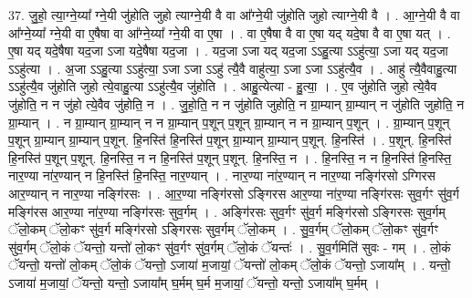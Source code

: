 \documentclass[17pt]{extarticle}
\begin{document}
37. जु॒हो॒ त्या॒ग्ने॒य्या᳚ ग्ने॒यी जु॑होति जुहो त्याग्ने॒यी वै वा आ᳚ग्ने॒यी जु॑होति जुहो त्याग्ने॒यी वै । . आ॒ग्ने॒यी वै वा आ᳚ग्ने॒य्या᳚ ग्ने॒यी वा ए॒षैषा वा आ᳚ग्ने॒य्या᳚ ग्ने॒यी वा ए॒षा । . वा ए॒षैषा वै वा ए॒षा यद् यदे॒षा वै वा ए॒षा यत् । . ए॒षा यद् यदे॒षैषा यद॒जा ऽजा यदे॒षैषा यद॒जा । . यद॒जा ऽजा यद् यद॒जा ऽऽहु॒त्या ऽऽहु॑त्या॒ ऽजा यद् यद॒जा ऽऽहु॑त्या । . अ॒जा ऽऽहु॒त्या ऽऽहु॑त्या॒ ऽजा ऽजा ऽऽहु॑ त्यै॒वै वाहु॑त्या॒ ऽजा ऽजा ऽऽहु॑त्यै॒व । . आहु॑ त्यै॒वैवाहु॒त्या ऽऽहु॑त्यै॒व जु॑होति जुहो त्ये॒वाहु॒त्या ऽऽहु॑त्यै॒व जु॑होति । . आहु॒त्येत्या - हु॒त्या॒ । . ए॒व जु॑होति जुहो त्ये॒वैव जु॑होति॒ न न जु॑हो त्ये॒वैव जु॑होति॒ न । . जु॒हो॒ति॒ न न जु॑होति जुहोति॒ न ग्रा॒म्यान् ग्रा॒म्यान् न जु॑होति जुहोति॒ न ग्रा॒म्यान् । . न ग्रा॒म्यान् ग्रा॒म्यान् न न ग्रा॒म्यान् प॒शून् प॒शून् ग्रा॒म्यान् न न ग्रा॒म्यान् प॒शून् । . ग्रा॒म्यान् प॒शून् प॒शून् ग्रा॒म्यान् ग्रा॒म्यान् प॒शून्. हि॒नस्ति॑ हि॒नस्ति॑ प॒शून् ग्रा॒म्यान् ग्रा॒म्यान् प॒शून्. हि॒नस्ति॑ । . प॒शून्. हि॒नस्ति॑ हि॒नस्ति॑ प॒शून् प॒शून्. हि॒नस्ति॒ न न हि॒नस्ति॑ प॒शून् प॒शून्. हि॒नस्ति॒ न । . हि॒नस्ति॒ न न हि॒नस्ति॑ हि॒नस्ति॒ नार॒ण्या ना॑र॒ण्यान् न हि॒नस्ति॑ हि॒नस्ति॒ नार॒ण्यान् । . नार॒ण्या ना॑र॒ण्यान् न नार॒ण्या नङ्गि॑रसो ऽग्गिरस आर॒ण्यान् न नार॒ण्या नङ्गि॑रसः । . आ॒र॒ण्या नङ्गि॑रसो ऽङ्गिरस आर॒ण्या ना॑र॒ण्या नङ्गि॑रसः सुव॒र्गꣳ सु॑व॒र्ग मङ्गि॑रस आर॒ण्या ना॑र॒ण्या नङ्गि॑रसः सुव॒र्गम् । . अङ्गि॑रसः सुव॒र्गꣳ सु॑व॒र्ग मङ्गि॑रसो ऽङ्गिरसः सुव॒र्गम् ॅलो॒कम् ॅलो॒कꣳ सु॑व॒र्ग 
मङ्गि॑रसो ऽङ्गिरसः सुव॒र्गम् ॅलो॒कम् । . सु॒व॒र्गम् ॅलो॒कम् ॅलो॒कꣳ सु॑व॒र्गꣳ सु॑व॒र्गम् ॅलो॒कं ॅयन्तो॒ यन्तो॑ लो॒कꣳ सु॑व॒र्गꣳ सु॑व॒र्गम् ॅलो॒कं ॅयन्तः॑ । . सु॒व॒र्गमिति॑ सुवः - गम् । . लो॒कं ॅयन्तो॒ यन्तो॑ लो॒कम् ॅलो॒कं ॅयन्तो॒ ऽजाया॑ म॒जायां॒ ॅयन्तो॑ लो॒कम् ॅलो॒कं ॅयन्तो॒ ऽजाया᳚म् । . यन्तो॒ ऽजाया॑ म॒जायां॒ ॅयन्तो॒ यन्तो॒ ऽजाया᳚म् घ॒र्मम् घ॒र्म म॒जायां॒ ॅयन्तो॒ यन्तो॒ ऽजाया᳚म् घ॒र्मम् । \newline
\pagebreak
{}
\end{document}
